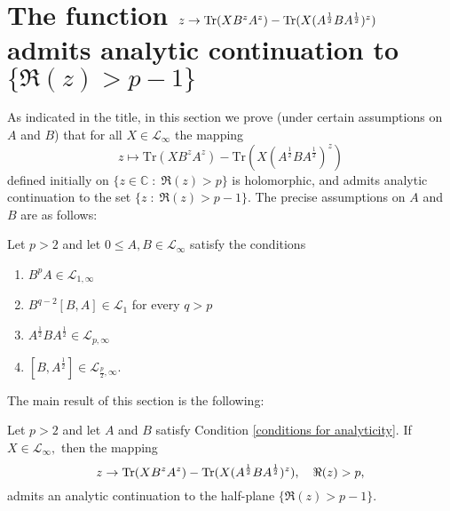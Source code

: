 \section[The difference of two $\zeta-$functions admits analytic continuation]{The function $z\to{\rm Tr}(XB^zA^z)-{\rm Tr}(X(A^{\frac12}BA^{\frac12})^z)$ admits analytic continuation to $\{\Re(z)>p-1\}$}\label{difference section}
    As indicated in the title, in this section we prove (under certain assumptions on $A$ and $B$) that for all $X \in \mathcal{L}_\infty$ the mapping
    \begin{equation*}
        z \mapsto \mathrm{Tr}(XB^zA^z)-\mathrm{Tr}(X(A^{\frac{1}{2}}BA^{\frac{1}{2}})^z)
    \end{equation*}
    defined initially on $\{z\in \mathbb{C}\;:\; \Re(z) > p\}$ is holomorphic, and admits analytic continuation to the set $\{z\;:\;\Re(z) > p-1\}$.
    The precise assumptions on $A$ and $B$ are as follows:
    \begin{cond}\label{conditions for analyticity} 
        Let $p>2$ and let $0\leq A,B\in\mathcal{L}_{\infty}$ satisfy the conditions
        \begin{enumerate}[{\rm (i)}]
            \item\label{anacond1} $B^pA\in\mathcal{L}_{1,\infty}$
            \item\label{anacond2} $B^{q-2}[B,A]\in\mathcal{L}_1$ for every $q>p$
            \item\label{anacond3} $A^{\frac12}BA^{\frac12}\in\mathcal{L}_{p,\infty}$
            \item\label{anacond4} $[B,A^{\frac12}]\in\mathcal{L}_{\frac{p}{2},\infty}$.
        \end{enumerate}
    \end{cond}
    
    The main result of this section is the following:
    \begin{thm}\label{analyticity theorem I} 
        Let $p>2$ and let $A$ and $B$ satisfy Condition \ref{conditions for analyticity}. If $X\in\mathcal{L}_{\infty},$ then the mapping
        $$z\to{\rm Tr}(XB^zA^z)-{\rm Tr}(X(A^{\frac12}BA^{\frac12})^z),\quad \Re(z)>p,$$
        admits an analytic continuation to the half-plane $\{\Re(z)>p-1\}.$
    \end{thm}

